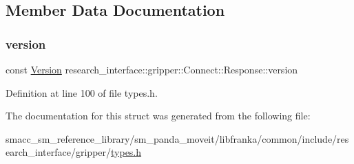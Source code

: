 \subsection{Member Data Documentation}
\mbox{\label{structresearch__interface_1_1gripper_1_1Connect_1_1Response_a355fda854036780345497c2229f30135}} 
\subsubsection{\texorpdfstring{version}{version}}
{\footnotesize\ttfamily const \hyperlink{namespaceresearch__interface_1_1gripper_a76ede520b2fa3582ac95cd919eceef5b}{Version} research\+\_\+interface\+::gripper\+::\+Connect\+::\+Response\+::version}



Definition at line 100 of file types.\+h.



The documentation for this struct was generated from the following file\+:\begin{DoxyCompactItemize}
\item 
smacc\+\_\+sm\+\_\+reference\+\_\+library/sm\+\_\+panda\+\_\+moveit/libfranka/common/include/research\+\_\+interface/gripper/\hyperlink{types_8h}{types.\+h}\end{DoxyCompactItemize}
